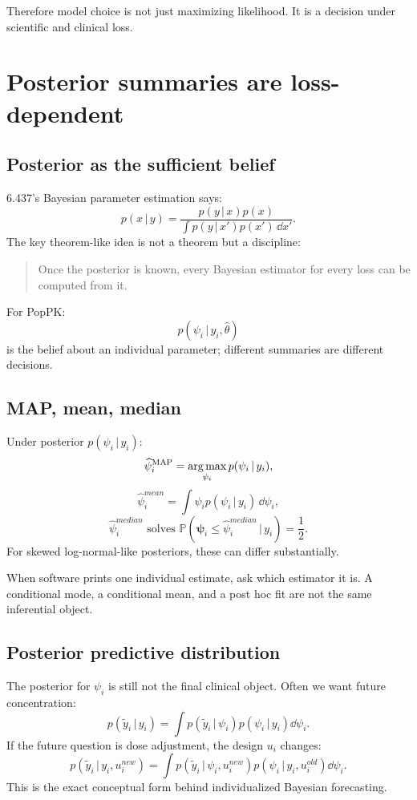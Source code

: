 \documentclass[a4paper]{article}
\DeclareMathOperator*{\argmax}{arg\,max}
\newcommand{\rpsi}{\boldsymbol{\psi}}
\newcommand{\given}{\,|\,}
\newcommand{\Prob}{\mathbb{P}}
\begin{document}
Therefore model choice is not just maximizing likelihood. It is a decision under scientific and clinical loss.

\section{Posterior summaries are loss-dependent}

\subsection{Posterior as the sufficient belief}

6.437's Bayesian parameter estimation says:
\[
  p(x\given y)
  =
  \frac{p(y\given x)p(x)}
  {\int p(y\given x')p(x')\,\dd x'}.
\]
The key theorem-like idea is not a theorem but a discipline:

\begin{quote}
  Once the posterior is known, every Bayesian estimator for every loss can be computed from it.
\end{quote}

For PopPK:
\[
  p(\psi_i\given y_i,\widehat\theta)
\]
is the belief about an individual parameter; different summaries are different decisions.

\subsection{MAP, mean, median}

Under posterior \(p(\psi_i\given y_i)\):
\[
  \widehat{\psi}^{\pklab{MAP}}_i
  =
  \argmax_{\psi_i}p(\psi_i\given y_i),
\]
\[
  \widehat{\psi}^{mean}_i
  =
  \int \psi_i p(\psi_i\given y_i)\,\dd \psi_i,
\]
\[
  \widehat{\psi}^{median}_i
  \text{ solves }
  \Prob(\rpsi_i\le \widehat{\psi}^{median}_i\given y_i)=\frac{1}{2}.
\]
For skewed log-normal-like posteriors, these can differ substantially.

\begin{warning}
  When software prints one individual estimate, ask which estimator it is. A conditional mode, a conditional mean, and a post hoc fit are not the same inferential object.
\end{warning}

\subsection{Posterior predictive distribution}

The posterior for \(\psi_i\) is still not the final clinical object. Often we want future concentration:
\[
  p(\tilde y_i\given y_i)
  =
  \int
  p(\tilde y_i\given \psi_i)
  p(\psi_i\given y_i)
  \dd\psi_i.
\]
If the future question is dose adjustment, the design \(u_i\) changes:
\[
  p(\tilde y_i\given y_i,u_i^{new})
  =
  \int
  p(\tilde y_i\given \psi_i,u_i^{new})
  p(\psi_i\given y_i,u_i^{old})
  \dd\psi_i.
\]
This is the exact conceptual form behind individualized Bayesian forecasting.
\end{document}
